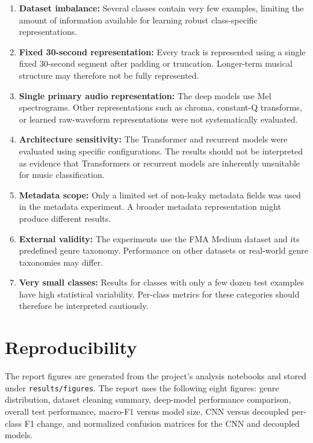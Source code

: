 \documentclass[11pt,a4paper]{article}
\begin{document}
\begin{enumerate}
    \item \textbf{Dataset imbalance:} Several classes contain very few examples, limiting the amount of information available for learning robust class-specific representations.

    \item \textbf{Fixed 30-second representation:} Every track is represented using a single fixed 30-second segment after padding or truncation. Longer-term musical structure may therefore not be fully represented.

    \item \textbf{Single primary audio representation:} The deep models use Mel spectrograms. Other representations such as chroma, constant-Q transforms, or learned raw-waveform representations were not systematically evaluated.

    \item \textbf{Architecture sensitivity:} The Transformer and recurrent models were evaluated using specific configurations. The results should not be interpreted as evidence that Transformers or recurrent models are inherently unsuitable for music classification.

    \item \textbf{Metadata scope:} Only a limited set of non-leaky metadata fields was used in the metadata experiment. A broader metadata representation might produce different results.

    \item \textbf{External validity:} The experiments use the FMA Medium dataset and its predefined genre taxonomy. Performance on other datasets or real-world genre taxonomies may differ.

    \item \textbf{Very small classes:} Results for classes with only a few dozen test examples have high statistical variability. Per-class metrics for these categories should therefore be interpreted cautiously.
\end{enumerate}

\section{Reproducibility}

The report figures are generated from the project's analysis notebooks and stored under \texttt{results/figures}. The report uses the following eight figures: genre distribution, dataset cleaning summary, deep-model performance comparison, overall test performance, macro-F1 versus model size, CNN versus decoupled per-class F1 change, and normalized confusion matrices for the CNN and decoupled models.
\end{document}
